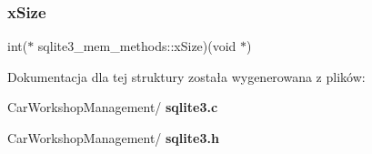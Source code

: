 \mbox{\label{structsqlite3__mem__methods_a6c68275b577d66ae659ef30344c8f86c}} 
\subsubsection{xSize}
{\footnotesize\ttfamily int($\ast$ sqlite3\+\_\+mem\+\_\+methods\+::x\+Size)(void $\ast$)}



Dokumentacja dla tej struktury została wygenerowana z plików\+:\begin{DoxyCompactItemize}
\item 
Car\+Workshop\+Management/\textbf{ sqlite3.\+c}\item 
Car\+Workshop\+Management/\textbf{ sqlite3.\+h}\end{DoxyCompactItemize}
